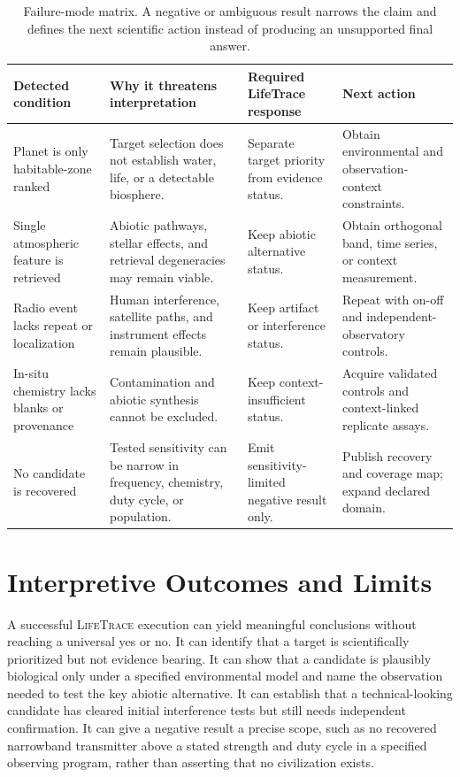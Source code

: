 \documentclass[conference]{IEEEtran}
\newcommand{\lifetrace}{\textsc{LifeTrace}}
\begin{document}
\begin{table}[t]
\caption{Failure-mode matrix. A negative or ambiguous result narrows the claim and defines the next scientific action instead of producing an unsupported final answer.}
\label{tab:failure}
\centering
\footnotesize
\setlength{\tabcolsep}{3pt}
\begin{tabular}{p{} p{} p{} p{}}
\hline
\textbf{Detected condition} & \textbf{Why it threatens interpretation} & \textbf{Required LifeTrace response} & \textbf{Next action}\\
\hline
Planet is only habitable-zone ranked & Target selection does not establish water, life, or a detectable biosphere. & Separate target priority from evidence status. & Obtain environmental and observation-context constraints.\\
Single atmospheric feature is retrieved & Abiotic pathways, stellar effects, and retrieval degeneracies may remain viable. & Keep abiotic alternative status. & Obtain orthogonal band, time series, or context measurement.\\
Radio event lacks repeat or localization & Human interference, satellite paths, and instrument effects remain plausible. & Keep artifact or interference status. & Repeat with on-off and independent-observatory controls.\\
In-situ chemistry lacks blanks or provenance & Contamination and abiotic synthesis cannot be excluded. & Keep context-insufficient status. & Acquire validated controls and context-linked replicate assays.\\
No candidate is recovered & Tested sensitivity can be narrow in frequency, chemistry, duty cycle, or population. & Emit sensitivity-limited negative result only. & Publish recovery and coverage map; expand declared domain.\\
\hline
\end{tabular}
\end{table}

\section{Interpretive Outcomes and Limits}

A successful \lifetrace{} execution can yield meaningful conclusions without reaching a universal yes or no. It can identify that a target is scientifically prioritized but not evidence bearing. It can show that a candidate is plausibly biological only under a specified environmental model and name the observation needed to test the key abiotic alternative. It can establish that a technical-looking candidate has cleared initial interference tests but still needs independent confirmation. It can give a negative result a precise scope, such as no recovered narrowband transmitter above a stated strength and duty cycle in a specified observing program, rather than asserting that no civilization exists.
\end{document}
